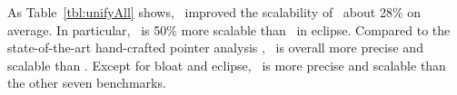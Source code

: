 As Table~\ref{tbl:unifyAll} shows, \ourtool~improved the scalability of \callSL~about 28\% on average. In particular, \callSLG~is 50\% more scalable than \callSL~in eclipse. Compared to the state-of-the-art hand-crafted pointer analysis \BatonUnity, \callSLG~is overall more precise and scalable than \BatonUnity. Except for bloat and eclipse, \callSLG~is more precise and scalable than the other seven benchmarks.





